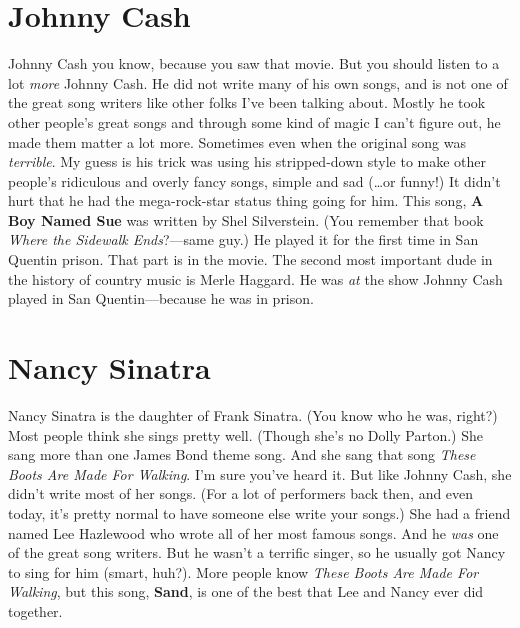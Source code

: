 \documentclass[letterpaper,single]{article}
\begin{document}
\section{Johnny Cash}
Johnny Cash you know, because you saw that movie.
But you should listen to a lot \emph{more} Johnny Cash. 
He did not write many of his own songs, and is not one of the great song writers like other folks I've been talking about. 
Mostly he took other people's great songs and through some kind of magic I can't figure out, he made them matter a lot more.
Sometimes even when the original song was \emph{terrible}. 
My guess is his trick was using his stripped-down style to make other people's ridiculous and overly fancy songs, simple and sad (\ldots or funny!)
It didn't hurt that he had the mega-rock-star status thing going for him.
This song, \textbf{A Boy Named Sue} was written by Shel Silverstein. 
(You remember that book \emph{Where the Sidewalk Ends}?---same guy.) 
He played it for the first time in San Quentin prison. 
That part is in the movie.
The second most important dude in the history of country music is Merle Haggard. He was \emph{at} the show Johnny Cash played in San Quentin---because he was in prison.

\section{Nancy Sinatra}
Nancy Sinatra is the daughter of Frank Sinatra. (You know who he was, right?) 
Most people think she sings pretty well. (Though she's no Dolly Parton.)
She sang more than one James Bond theme song. 
And she sang that song \emph{These Boots Are Made For Walking}. 
I'm sure you've heard it. 
But like Johnny Cash, she didn't write most of her songs. 
(For a lot of performers back then, and even today, it's pretty normal to have someone else write your songs.)
She had a friend named Lee Hazlewood who wrote all of her most famous songs. 
And he \emph{was} one of the great song writers. 
But he wasn't a terrific singer, so he usually got Nancy to sing for him (smart, huh?). 
More people know \emph{These Boots Are Made For Walking}, but this song, \textbf{Sand}, is one of the best that Lee and Nancy ever did together.
\end{document}
